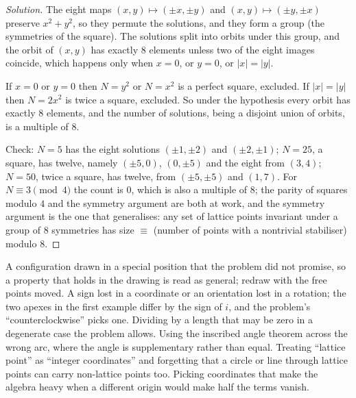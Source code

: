 \begin{proof}[Solution]
The eight maps $(x,y)\mapsto(\pm x,\pm y)$ and $(x,y)\mapsto(\pm y,\pm x)$ preserve $x^2+y^2$, so they permute the solutions, and they form a group (the symmetries of the square). The solutions split into orbits under this group, and the orbit of $(x,y)$ has exactly $8$ elements unless two of the eight images coincide, which happens only when $x=0$, or $y=0$, or $|x|=|y|$.

If $x=0$ or $y=0$ then $N=y^2$ or $N=x^2$ is a perfect square, excluded. If $|x|=|y|$ then $N=2x^2$ is twice a square, excluded. So under the hypothesis every orbit has exactly $8$ elements, and the number of solutions, being a disjoint union of orbits, is a multiple of $8$.

Check: $N=5$ has the eight solutions $(\pm1,\pm2)$ and $(\pm2,\pm1)$; $N=25$, a square, has twelve, namely $(\pm5,0)$, $(0,\pm5)$ and the eight from $(3,4)$; $N=50$, twice a square, has twelve, from $(\pm5,\pm5)$ and $(1,7)$. For $N\equiv3\pmod4$ the count is $0$, which is also a multiple of $8$; the parity of squares modulo $4$ and the symmetry argument are both at work, and the symmetry argument is the one that generalises: any set of lattice points invariant under a group of $8$ symmetries has size $\equiv$ (number of points with a nontrivial stabiliser) modulo $8$.
\end{proof}

\begin{trap}
A configuration drawn in a special position that the problem did not promise, so a property that holds in the drawing is read as general; redraw with the free points moved. A sign lost in a coordinate or an orientation lost in a rotation; the two apexes in the first example differ by the sign of $i$, and the problem's ``counterclockwise'' picks one. Dividing by a length that may be zero in a degenerate case the problem allows. Using the inscribed angle theorem across the wrong arc, where the angle is supplementary rather than equal. Treating ``lattice point'' as ``integer coordinates'' and forgetting that a circle or line through lattice points can carry non-lattice points too. Picking coordinates that make the algebra heavy when a different origin would make half the terms vanish.
\end{trap}


